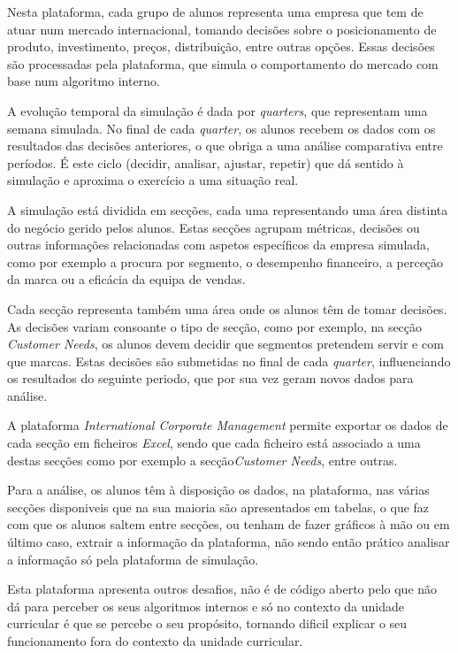 Nesta plataforma, cada grupo de alunos representa uma empresa que tem de atuar num mercado internacional, tomando decisões sobre o posicionamento de produto, investimento, preços, distribuição, entre outras opções. Essas decisões são processadas pela plataforma, que simula o comportamento do mercado com base num algoritmo interno. 

A evolução temporal da simulação é dada por \textit{quarters}, que representam uma semana simulada. No final de cada \textit{quarter}, os alunos recebem os dados com os resultados das decisões anteriores, o que obriga a uma análise comparativa entre períodos. É este ciclo (decidir, analisar, ajustar, repetir) que dá sentido à simulação e aproxima o exercício a uma situação real.

A simulação está dividida em secções, cada uma representando uma área distinta do negócio gerido pelos alunos. Estas secções agrupam métricas, decisões ou outras informações relacionadas com aspetos específicos da empresa simulada, como por exemplo a procura por segmento, o desempenho financeiro, a perceção da marca ou a eficácia da equipa de vendas.

Cada secção representa também uma área onde os alunos têm de tomar decisões. As decisões variam consoante o tipo de secção, como por exemplo, na secção \textit{Customer Needs}, os alunos devem decidir que segmentos pretendem servir e com que marcas. Estas decisões são submetidas no final de cada \textit{quarter}, influenciando os resultados do seguinte periodo, que por sua vez geram novos dados para análise.

A plataforma \textit{International Corporate Management} permite exportar os dados de cada secção em ficheiros \textit{Excel}, sendo que cada ficheiro está associado a uma destas secções como por exemplo a secção\textit{Customer Needs}, entre outras.

Para a análise, os alunos têm à disposição os dados, na plataforma, nas várias secções disponiveis que na sua maioria são apresentados em tabelas, o que faz com que os alunos saltem entre secções, ou tenham de fazer gráficos à mão ou em último caso, extrair a informação da plataforma, não sendo então prático analisar a informação só pela plataforma de simulação.

Esta plataforma apresenta outros desafios, não é de código aberto pelo que não dá para perceber os seus algoritmos internos e só no contexto da unidade curricular é que se percebe o seu propósito, tornando dificil explicar o seu funcionamento fora do contexto da unidade curricular.

